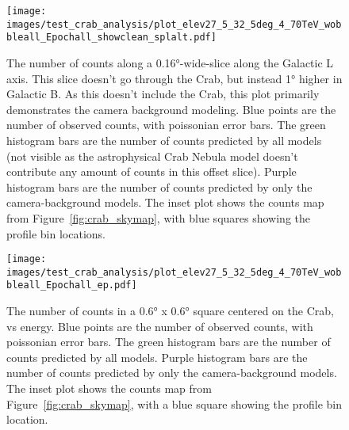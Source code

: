   \begin{figure}[h]
    \centering
    \texttt{[image: images/test\_crab\_analysis/plot\_elev27\_5\_32\_5deg\_4\_70TeV\_wobbleall\_Epochall\_showclean\_splalt.pdf]}
    \caption[Crab Profile along Galactic L Off Source]
    {
      The number of counts along a \ang{0.16}-wide-slice along the Galactic L axis.
      This slice doesn't go through the Crab, but instead \ang{1} higher in Galactic B.
      As this doesn't include the Crab, this plot primarily demonstrates the camera background modeling.
      Blue points are the number of observed counts, with poissonian error bars.
      The green histogram bars are the number of counts predicted by all models (not visible as the astrophysical Crab Nebula model doesn't contribute any amount of counts in this offset slice).
      Purple histogram bars are the number of counts predicted by only the camera-background models.
      The inset plot shows the counts map from Figure~\ref{fig:crab_skymap}, with blue squares showing the profile bin locations.
    }
    \label{fig:crab_profile_l_off}
  \end{figure}

  \begin{figure}[h]
    \centering
    \texttt{[image: images/test\_crab\_analysis/plot\_elev27\_5\_32\_5deg\_4\_70TeV\_wobbleall\_Epochall\_ep.pdf]}
    \caption[Crab Profile in Energy]
    {
      The number of counts in a \ang{0.6} x \ang{0.6} square centered on the Crab, vs energy.
      Blue points are the number of observed counts, with poissonian error bars.
      The green histogram bars are the number of counts predicted by all models.
      Purple histogram bars are the number of counts predicted by only the camera-background models.
      The inset plot shows the counts map from Figure~\ref{fig:crab_skymap}, with a blue square showing the profile bin location.
    }
    \label{fig:crab_profile_energy}
  \end{figure}
    
